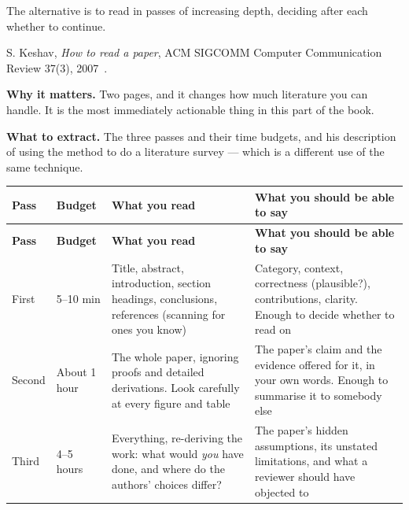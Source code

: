 The alternative is to read in passes of increasing depth, deciding after each
whether to continue.

\begin{paperbox}
S. Keshav, \emph{How to read a paper}, ACM SIGCOMM Computer Communication
Review 37(3), 2007~\cite{keshav2007read}.

\medskip
\textbf{Why it matters.} Two pages, and it changes how much literature you can
handle. It is the most immediately actionable thing in this part of the book.

\medskip
\textbf{What to extract.} The three passes and their time budgets, and his
description of using the method to do a literature survey --- which is a
different use of the same technique.
\end{paperbox}

\begin{center}
\small
\begin{longtable}{@{}L{1.5cm}L{2.0cm}L{4.6cm}L{5.6cm}@{}}
\toprule
\textbf{Pass} & \textbf{Budget} & \textbf{What you read} & \textbf{What you should be able to say} \\
\midrule
\endfirsthead
\toprule
\textbf{Pass} & \textbf{Budget} & \textbf{What you read} & \textbf{What you should be able to say} \\
\midrule
\endhead
\bottomrule
\endfoot
First  & 5--10 min
       & Title, abstract, introduction, section headings, conclusions,
         references (scanning for ones you know)
       & Category, context, correctness (plausible?), contributions, clarity.
         Enough to decide whether to read on \\
Second & About 1 hour
       & The whole paper, ignoring proofs and detailed derivations. Look
         carefully at every figure and table
       & The paper's claim and the evidence offered for it, in your own words.
         Enough to summarise it to somebody else \\
Third  & 4--5 hours
       & Everything, re-deriving the work: what would \emph{you} have done,
         and where do the authors' choices differ?
       & The paper's hidden assumptions, its unstated limitations, and what a
         reviewer should have objected to \\
\end{longtable}
\end{center}

